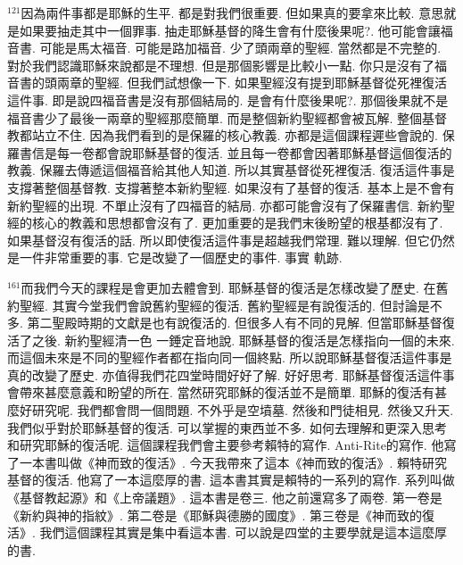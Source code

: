 \documentclass{book}
\begin{document}
$^{121}$因為兩件事都是耶穌的生平.
都是對我們很重要.
但如果真的要拿來比較.
意思就是如果要抽走其中一個罪事.
抽走耶穌基督的降生會有什麼後果呢?.
他可能會讓福音書.
可能是馬太福音.
可能是路加福音.
少了頭兩章的聖經.
當然都是不完整的.
對於我們認識耶穌來說都是不理想.
但是那個影響是比較小一點.
你只是沒有了福音書的頭兩章的聖經.
但我們試想像一下.
如果聖經沒有提到耶穌基督從死裡復活這件事.
即是說四福音書是沒有那個結局的.
是會有什麼後果呢?.
那個後果就不是福音書少了最後一兩章的聖經那麼簡單.
而是整個新約聖經都會被瓦解.
整個基督教都站立不住.
因為我們看到的是保羅的核心教義.
亦都是這個課程遲些會說的.
保羅書信是每一卷都會說耶穌基督的復活.
並且每一卷都會因著耶穌基督這個復活的教義.
保羅去傳遞這個福音給其他人知道.
所以其實基督從死裡復活.
復活這件事是支撐著整個基督教.
支撐著整本新約聖經.
如果沒有了基督的復活.
基本上是不會有新約聖經的出現.
不單止沒有了四福音的結局.
亦都可能會沒有了保羅書信.
新約聖經的核心的教義和思想都會沒有了.
更加重要的是我們末後盼望的根基都沒有了.
如果基督沒有復活的話.
所以即使復活這件事是超越我們常理.
難以理解.
但它仍然是一件非常重要的事.
它是改變了一個歷史的事件.
事實 軌跡.

$^{161}$而我們今天的課程是會更加去體會到.
耶穌基督的復活是怎樣改變了歷史.
在舊約聖經.
其實今堂我們會說舊約聖經的復活.
舊約聖經是有說復活的.
但討論是不多.
第二聖殿時期的文獻是也有說復活的.
但很多人有不同的見解.
但當耶穌基督復活了之後.
新約聖經清一色 一錘定音地說.
耶穌基督的復活是怎樣指向一個的未來.
而這個未來是不同的聖經作者都在指向同一個終點.
所以說耶穌基督復活這件事是真的改變了歷史.
亦值得我們花四堂時間好好了解.
好好思考.
耶穌基督復活這件事會帶來甚麼意義和盼望的所在.
當然研究耶穌的復活並不是簡單.
耶穌的復活有甚麼好研究呢.
我們都會問一個問題.
不外乎是空墳墓.
然後和門徒相見.
然後又升天.
我們似乎對於耶穌基督的復活.
可以掌握的東西並不多.
如何去理解和更深入思考和研究耶穌的復活呢.
這個課程我們會主要參考賴特的寫作.
Anti-Rite的寫作.
他寫了一本書叫做《神而致的復活》.
今天我帶來了這本《神而致的復活》.
賴特研究基督的復活.
他寫了一本這麼厚的書.
這本書其實是賴特的一系列的寫作.
系列叫做《基督教起源》和《上帝議題》.
這本書是卷三.
他之前還寫多了兩卷.
第一卷是《新約與神的指紋》.
第二卷是《耶穌與德勝的國度》.
第三卷是《神而致的復活》.
我們這個課程其實是集中看這本書.
可以說是四堂的主要學就是這本這麼厚的書.
\end{document}
